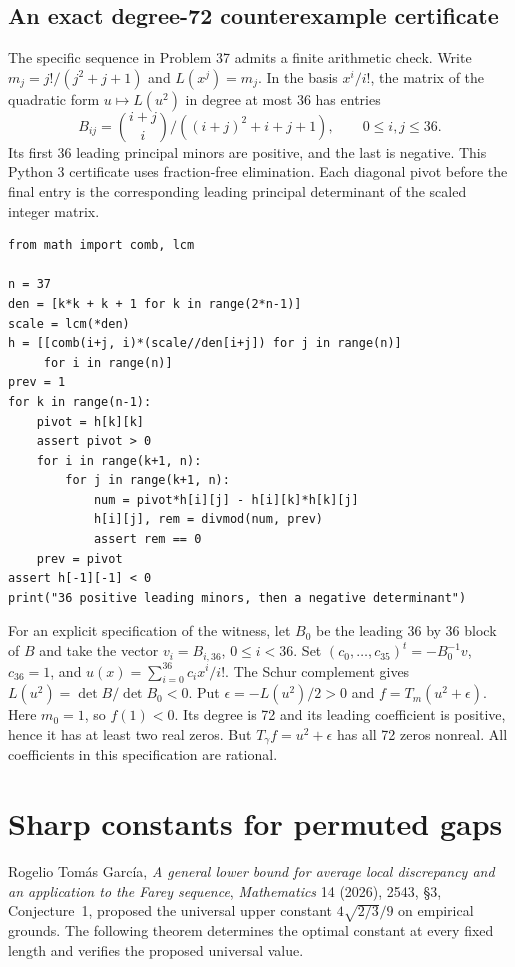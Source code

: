 \documentclass[11pt,a4paper]{article}
\begin{document}
\subsection{An exact degree-72 counterexample certificate}
The specific sequence in Problem 37 admits a finite arithmetic check.
Write $m_j=j!/(j^2+j+1)$ and $L(x^j)=m_j$. In the basis $x^i/i!$,
the matrix of the quadratic form $u\mapsto L(u^2)$ in degree at most
36 has entries
\[
 B_{ij}=\binom{i+j}{i}\big/((i+j)^2+i+j+1),\qquad 0\le i,j\le36.
\]
Its first 36 leading principal minors are positive, and the last is
negative. This Python 3 certificate uses fraction-free elimination.
Each diagonal pivot before the final entry is the corresponding
leading principal determinant of the scaled integer matrix.
\begin{verbatim}
from math import comb, lcm

n = 37
den = [k*k + k + 1 for k in range(2*n-1)]
scale = lcm(*den)
h = [[comb(i+j, i)*(scale//den[i+j]) for j in range(n)]
     for i in range(n)]
prev = 1
for k in range(n-1):
    pivot = h[k][k]
    assert pivot > 0
    for i in range(k+1, n):
        for j in range(k+1, n):
            num = pivot*h[i][j] - h[i][k]*h[k][j]
            h[i][j], rem = divmod(num, prev)
            assert rem == 0
    prev = pivot
assert h[-1][-1] < 0
print("36 positive leading minors, then a negative determinant")
\end{verbatim}
For an explicit specification of the witness, let $B_0$ be the
leading $36$ by $36$ block of $B$ and take the vector $v_i=B_{i,36}$,
$0\le i<36$. Set $(c_0,\ldots,c_{35})^t=-B_0^{-1}v$, $c_{36}=1$,
and $u(x)=\sum_{i=0}^{36}c_ix^i/i!$. The Schur complement gives
$L(u^2)=\det B/\det B_0<0$. Put $\epsilon=-L(u^2)/2>0$ and
$f=T_m(u^2+\epsilon)$. Here $m_0=1$, so $f(1)<0$.
Its degree is 72 and its leading coefficient is positive, hence it has
at least two real zeros. But $T_\gamma f=u^2+\epsilon$ has all 72 zeros
nonreal. All coefficients in this specification are rational.

\section{Sharp constants for permuted gaps}\label{sec:garcia}
Rogelio Tom\'as Garc\'ia, \emph{A general lower bound for average
local discrepancy and an application to the Farey sequence},
\emph{Mathematics} 14 (2026), 2543, \S3, Conjecture~1,
\cite{tg} proposed the universal upper constant $4\sqrt{2/3}/9$ on empirical
grounds. The following theorem determines the optimal constant at
every fixed length and verifies the proposed universal value.
\end{document}
